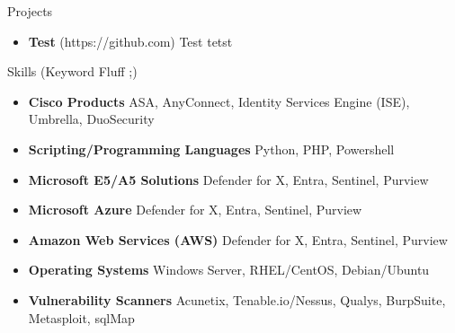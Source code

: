 \documentclass[]{mcdowellcv}
\begin{document}
\begin{cvsection}{Projects}
    \begin{cvsubsection}{}{}{}
        \begin{itemize}
            \setlength\itemsep{3pt}
            \item \textbf{Test} (https://github.com)  Test tetst
        \end{itemize}
    \end{cvsubsection}
\end{cvsection}

\begin{cvsection}{Skills (Keyword Fluff ;)}
    \begin{cvsubsection}{}{}{}
        \begin{itemize}
            \item \textbf{Cisco Products}  ASA, AnyConnect, Identity Services Engine (ISE), Umbrella, DuoSecurity
            \item \textbf{Scripting/Programming Languages}  Python, PHP, Powershell
            \item \textbf{Microsoft E5/A5 Solutions}  Defender for X, Entra, Sentinel, Purview
            \item \textbf{Microsoft Azure}  Defender for X, Entra, Sentinel, Purview
            \item \textbf{Amazon Web Services (AWS)}  Defender for X, Entra, Sentinel, Purview
            \item \textbf{Operating Systems}  Windows Server, RHEL/CentOS, Debian/Ubuntu
            \item \textbf{Vulnerability Scanners}  Acunetix, Tenable.io/Nessus, Qualys, BurpSuite, Metasploit, sqlMap
        \end{itemize}
    \end{cvsubsection}
\end{cvsection}
\customfooter
\end{document}
